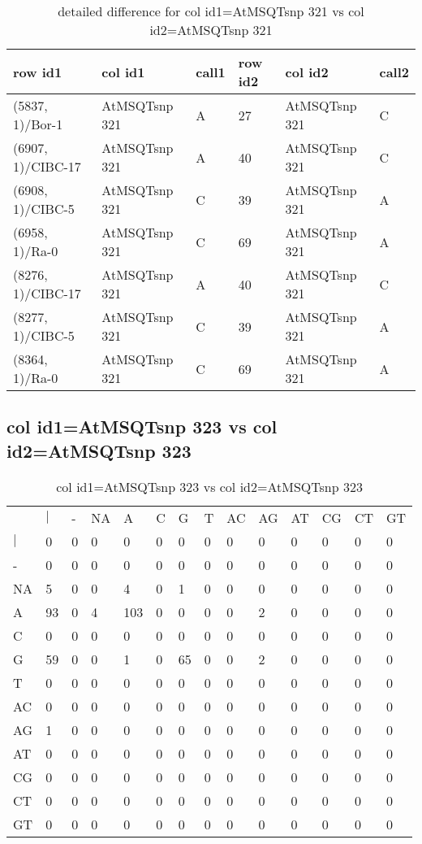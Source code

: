 \begin{center}
\begin{longtable}{|l|l|l|l|l|l|}
\caption{detailed difference for col id1=AtMSQTsnp 321 vs col id2=AtMSQTsnp 321} \label{table_dm851}\\
\hline
row id1&col id1&call1&row id2&col id2&call2\\
\hline
(5837, 1)/Bor-1&AtMSQTsnp 321&A&27&AtMSQTsnp 321&C\\
(6907, 1)/CIBC-17&AtMSQTsnp 321&A&40&AtMSQTsnp 321&C\\
(6908, 1)/CIBC-5&AtMSQTsnp 321&C&39&AtMSQTsnp 321&A\\
(6958, 1)/Ra-0&AtMSQTsnp 321&C&69&AtMSQTsnp 321&A\\
(8276, 1)/CIBC-17&AtMSQTsnp 321&A&40&AtMSQTsnp 321&C\\
(8277, 1)/CIBC-5&AtMSQTsnp 321&C&39&AtMSQTsnp 321&A\\
(8364, 1)/Ra-0&AtMSQTsnp 321&C&69&AtMSQTsnp 321&A\\
\hline
\end{longtable}
\end{center}

\subsection{col id1=AtMSQTsnp 323 vs col id2=AtMSQTsnp 323}
\begin{center}
\begin{longtable}{|l|l|l|l|l|l|l|l|l|l|l|l|l|l|}
\caption{col id1=AtMSQTsnp 323 vs col id2=AtMSQTsnp 323} \label{table_dm852}\\
\hline
\\
\hline
&$|$&-&NA&A&C&G&T&AC&AG&AT&CG&CT&GT\\
$|$&0&0&0&0&0&0&0&0&0&0&0&0&0\\
-&0&0&0&0&0&0&0&0&0&0&0&0&0\\
NA&5&0&0&4&0&1&0&0&0&0&0&0&0\\
A&93&0&4&103&0&0&0&0&2&0&0&0&0\\
C&0&0&0&0&0&0&0&0&0&0&0&0&0\\
G&59&0&0&1&0&65&0&0&2&0&0&0&0\\
T&0&0&0&0&0&0&0&0&0&0&0&0&0\\
AC&0&0&0&0&0&0&0&0&0&0&0&0&0\\
AG&1&0&0&0&0&0&0&0&0&0&0&0&0\\
AT&0&0&0&0&0&0&0&0&0&0&0&0&0\\
CG&0&0&0&0&0&0&0&0&0&0&0&0&0\\
CT&0&0&0&0&0&0&0&0&0&0&0&0&0\\
GT&0&0&0&0&0&0&0&0&0&0&0&0&0\\
\hline
\end{longtable}
\end{center}

